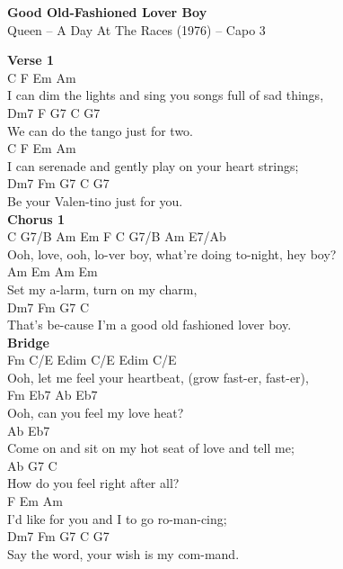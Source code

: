\documentclass[a4paper]{article}
\begin{document}
    \begin{center}
        \textbf{Good Old-Fashioned Lover Boy}
        ~\\
        Queen -- A Day At The Races (1976)
         -- Capo 3
    \end{center}
    {
        \scriptsize
        \textbf{Verse 1}
        ~\\
        {
            \cutive
            \obeyspaces
C                                  F             Em  Am
\\
 I can dim the lights and sing you songs full of sad things,
\\
Dm7            F     G7       C   G7
\\
 We can do the tango just for two.
\\
C                          F            Em    Am
\\
 I can serenade and gently play on your heart strings;
\\
Dm7            Fm   G7       C   G7
\\
 Be your Valen-tino just for you.
\\

        }
        \textbf{Chorus 1}
        ~\\
        {
            \cutive
            \obeyspaces
C     G7/B  Am   Em F   C   G7/B              Am         E7/Ab
\\
 Ooh, love, ooh, lo-ver boy, what're doing to-night, hey boy?
\\
    Am   Em         Am    Em
\\
Set my a-larm, turn on my charm,
\\
          Dm7                  Fm        G7    C
\\
That's be-cause I'm a good old fashioned lover boy.
\\

        }
        \textbf{Bridge}
        ~\\
        {
            \cutive
            \obeyspaces
Fm                     C/E              Edim C/E Edim C/E
\\
 Ooh, let me feel your heartbeat, (grow fast-er, fast-er),
\\
Fm   Eb7              Ab        Eb7
\\
 Ooh, can you feel my love heat?
\\
                      Ab          Eb7
\\
Come on and sit on my hot seat of love and tell me;
\\
Ab          G7               C
\\
 How do you feel right after all?
\\
                     F          Em  Am
\\
I'd like for you and I to go ro-man-cing;
\\
Dm7                 Fm      G7     C    G7
\\
 Say the word, your wish is my com-mand.
\\

}}
\end{document}
